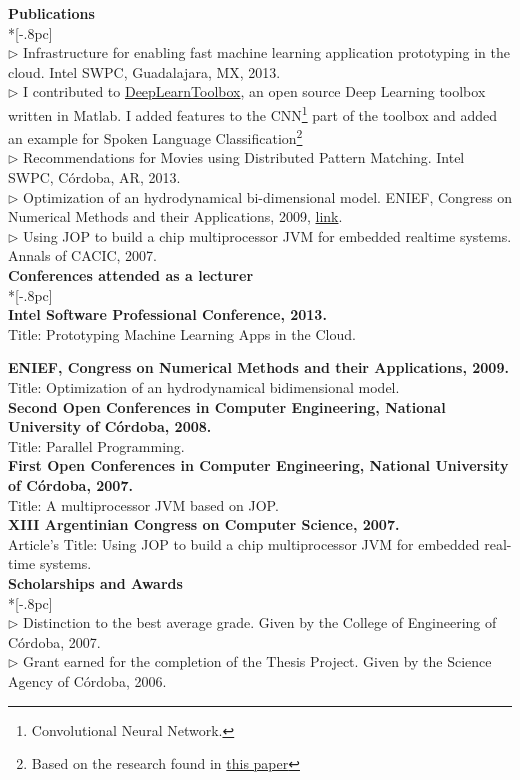 \documentclass[letter,11pt,english]{article}
\begin{document}
{\bf Publications} \\*[-.8pc]
\underline{\hspace{6in}} \\
$\triangleright$ Infrastructure for enabling fast machine learning application prototyping in the cloud. Intel SWPC, Guadalajara, MX, 2013.\\
$\triangleright$ I contributed to \href{https://github.com/rasmusbergpalm/DeepLearnToolbox} {DeepLearnToolbox},
an open source Deep Learning toolbox written in Matlab. I added features to the CNN\footnote{Convolutional Neural Network.}
part of the toolbox and added an example for Spoken Language Classification\footnote{Based on the research found in
\href{http://research.microsoft.com/en-us/um/people/dongyu/nips2009/papers/montavon-paper.pdf} {this paper}} \\
$\triangleright$ Recommendations for Movies using Distributed Pattern Matching. Intel SWPC, C\'ordoba, AR, 2013.\\
$\triangleright$ Optimization of an hydrodynamical bi-dimensional model. ENIEF, Congress on Numerical Methods 
and their Applications, 2009, \href{http://www.cimec.org.ar/ojs/index.php/mc/article/viewFile/2930/2867}{link}. \\
$\triangleright$ Using JOP to build a chip multiprocessor JVM for embedded realtime systems. Annals of CACIC, 2007.\\

{\large \bf Conferences attended as a lecturer} \\*[-.8pc]
\underline{\hspace{6in}} \\
{\bf  Intel Software Professional Conference, 2013.}\\
Title: Prototyping Machine Learning Apps in the Cloud. 

{\bf  ENIEF, Congress on Numerical Methods and their Applications, 2009.}\\
Title: Optimization of an hydrodynamical bidimensional model. 
\\
{\bf  Second Open Conferences in Computer Engineering, National University of C\'ordoba, 2008.}\\
Title: Parallel Programming.
\\
{\bf  First Open Conferences in Computer Engineering, National University of C\'ordoba, 2007.}\\
Title: A multiprocessor JVM based on JOP.
\\
{{\bf  XIII Argentinian Congress on Computer Science, 2007.}\\
Article's Title: Using JOP to build a chip multiprocessor JVM for embedded real-time systems.}
\\
{\bf Scholarships and Awards} \\*[-.8pc]
\underline{\hspace{6in}} \\
\renewcommand{\labelitemi}{}
$\triangleright$ Distinction to the best average grade.
Given by the College of Engineering of C\'ordoba, 2007.\\
$\triangleright$ Grant earned for the completion of the Thesis Project.
Given by the Science Agency of C\'ordoba, 2006.\\
\end{document}
